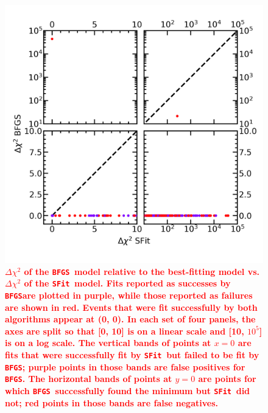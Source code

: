 \documentclass[preprint]{aastex631}
\newcommand{\HL}[1]{\textcolor{red}{\bf#1}}
\newcommand{\bfgs}{\texttt{BFGS}}
\newcommand{\sfit}{\texttt{SFit}}
\begin{document}
\begin{figure}
	\begin{centering}
	\includegraphics[height=0.5\textheight]{figs/Dchi2_BFGS.png}
	\caption{\HL{$\Delta\chi^2$ of the \bfgs\, model relative to the best-fitting model vs. $\Delta\chi^2$ of the \sfit\, model. Fits reported as successes by \bfgs are plotted in purple, while those reported as failures are shown in red. Events that were fit successfully by both algorithms appear at (0, 0). In each set of four panels, the axes are split so that [0, 10] is on a linear scale and [10, $10^5$] is on a log scale. The vertical bands of points at $x=0$ are fits that were successfully fit by \sfit\, but failed to be fit by \bfgs; purple points in those bands are false positives for \bfgs. The horizontal bands of points at $y=0$ are points for which \bfgs\, successfully found the minimum but \sfit\, did not; red points in those bands are false negatives.}
	 \label{fig:dchi2_bfgs}}
	 \end{centering}
\end{figure}
\end{document}

